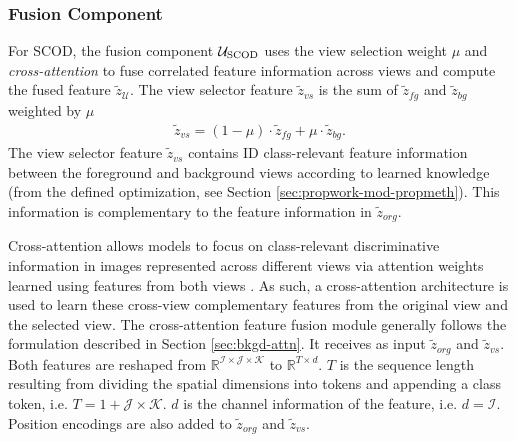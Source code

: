 \subsubsection{Fusion Component}
For SCOD, the fusion component $\mathcal{U}_{\text{SCOD}}$ uses the view selection weight $\mu$ and \emph{cross-attention} to fuse correlated feature information across views and compute the fused feature $\tilde{z}_{\mathcal{U}}$. The view selector feature $\tilde{z}_{vs}$ is the sum of $\tilde{z}_{fg}$ and $\tilde{z}_{bg}$ weighted by $\mu$
\begin{equation}
\begin{aligned}
     \tilde{z}_{vs} = (1 - \mu) \cdot \tilde{z}_{fg} + \mu \cdot \tilde{z}_{bg}.
\end{aligned}
\end{equation}
The view selector feature $\tilde{z}_{vs}$ contains ID class-relevant feature information between the foreground and background views according to learned knowledge (from the defined optimization, see Section \ref{sec:propwork-mod-propmeth}). This information is complementary to the feature information in $\tilde{z}_{org}$.

Cross-attention allows models to focus on class-relevant discriminative information in images represented across different views via attention weights learned using features from both views \cite{tsai2019multimodal,wang2024mutualformer,lee2024crossformer}. As such, a cross-attention architecture is used to learn these cross-view complementary features from the original view and the selected view. The cross-attention feature fusion module generally follows the formulation described in Section \ref{sec:bkgd-attn}. It receives as input $\tilde{z}_{org}$ and $\tilde{z}_{vs}$. Both features are reshaped from $\mathbb{R}^{\mathcal{I} \times \mathcal{J} \times \mathcal{K}}$ to $\mathbb{R}^{T \times d}$. $T$ is the sequence length resulting from dividing the spatial dimensions into tokens and appending a class token, i.e. $T = 1 + \mathcal{J} \times \mathcal{K}$. $d$ is the channel information of the feature, i.e. $d = \mathcal{I}$. Position encodings are also added to $\tilde{z}_{org}$ and $\tilde{z}_{vs}$.


